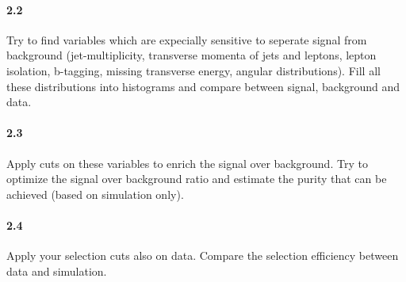 \documentclass[11pt]{article}
\begin{document}
\newpage
\paragraph{2.2}
Try to find variables which are expecially sensitive to seperate signal from background (jet-multiplicity, transverse momenta of jets and leptons, lepton isolation, b-tagging, missing transverse energy, angular distributions). Fill all these distributions into histograms and compare between signal, background and data.

\newpage
\paragraph{2.3}
Apply cuts on these variables to enrich the signal over background. Try to optimize the signal over background ratio and estimate the purity that can be achieved (based on simulation only).

\newpage
\paragraph{2.4}
Apply your selection cuts also on data. Compare the selection efficiency between data and simulation.
\end{document}
